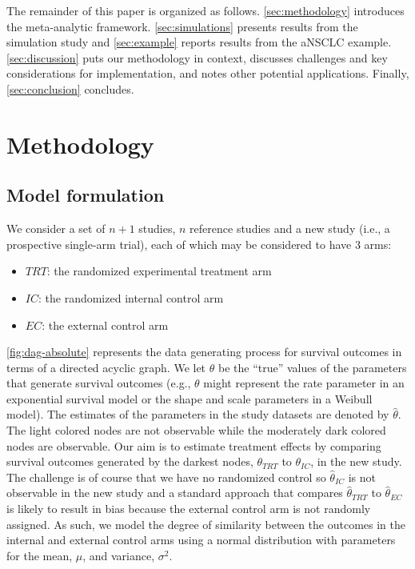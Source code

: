 \documentclass[11pt,final,fleqn]{article}\usepackage[]{graphicx}\usepackage[]{color}
\begin{document}
The remainder of this paper is organized as follows. \autoref{sec:methodology} introduces the meta-analytic framework. \autoref{sec:simulations} presents results from the simulation study and \autoref{sec:example} reports results from the aNSCLC example. \autoref{sec:discussion} puts our methodology in context,  discusses challenges and key considerations for implementation, and notes other potential applications. Finally, \autoref{sec:conclusion} concludes. 

\section{Methodology} \label{sec:methodology}

\subsection{Model formulation}
We consider a set of $n+1$ studies, $n$ reference studies and a new study (i.e., a prospective single-arm trial), each of which may be considered to have 3 arms:

\begin{itemize}
\item $TRT$: the randomized experimental treatment arm
\item $IC$: the randomized internal control arm
\item $EC$: the external control arm
\end{itemize}

\autoref{fig:dag-absolute} represents the data generating process for survival outcomes in terms of a directed acyclic graph. We let $\theta$ be the ``true'' values of the parameters that generate survival outcomes (e.g., $\theta$ might represent the rate parameter in an exponential survival model or the shape and scale parameters in a Weibull model). The estimates of the parameters in the study datasets are denoted by $\hat{\theta}$. The light colored nodes are not observable while the moderately dark colored nodes are observable. Our aim is to estimate treatment effects by comparing survival outcomes generated by the darkest nodes, $\theta_{TRT}$ to $\theta_{IC}$, in the new study. The challenge is of course that we have no randomized control so $\hat{\theta}_{IC}$ is not observable in the new study and a standard approach that compares $\hat{\theta}_{TRT}$  to $\hat{\theta}_{EC}$  is likely to result in bias because the external control arm is not randomly assigned. As such, we model the degree of similarity between the outcomes in the internal and external control arms using a normal distribution with parameters for the mean, $\mu$, and variance, $\sigma^2$. 
\end{document}
